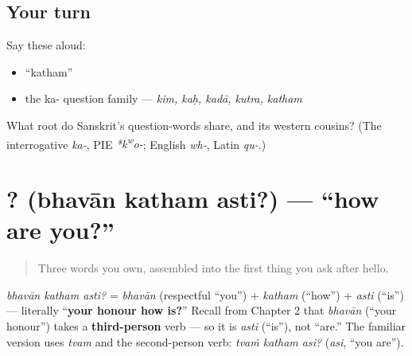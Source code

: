 \subsection*{Your turn}
Say these aloud:

\begin{itemize}
\raggedright
  \item \textquotedblleft{}katham\textquotedblright{}
  \item the ka- question family — \emph{kim, kaḥ, kadā, kutra, katham}
\end{itemize}

\begin{tcolorbox}[breakable,colback=teal!4,colframe=teal!35!black,title={Before you move on}]
What root do Sanskrit's question-words share, and its western cousins? (The interrogative \emph{ka-}, PIE \emph{*k\textsuperscript{w}o-}; English \emph{wh-}, Latin \emph{qu-}.)
\end{tcolorbox}
\section[\texorpdfstring{\sk{भवान्} \sk{कथम्} \sk{अस्ति}? (bhavān katham asti?)}{भवान् कथम् अस्ति? (bhavān katham asti?)}]{  ? (bhavān katham asti?) — \textquotedblleft{}how are you?\textquotedblright{}}

\label{lesson:SA-C03-bhavan-katham-asti}



\begin{quote}
Three words you own, assembled into the first thing you ask after hello.
\end{quote}

\begin{cousinweb}
\emph{bhavān katham asti?} = \emph{bhavān} (respectful \textquotedblleft{}you\textquotedblright{}) + \emph{katham} (\textquotedblleft{}how\textquotedblright{}) + \emph{asti} (\textquotedblleft{}is\textquotedblright{}) — literally \textquotedblleft{}\textbf{your honour how is?}\textquotedblright{} Recall from Chapter 2 that \emph{bhavān} (\textquotedblleft{}your honour\textquotedblright{}) takes a \textbf{third-person} verb — so it is \emph{asti} (\textquotedblleft{}is\textquotedblright{}), not \textquotedblleft{}are.\textquotedblright{} The familiar version uses \emph{tvam} and the second-person verb: \emph{tvaṁ katham asi?} (\emph{asi}, \textquotedblleft{}you are\textquotedblright{}).
\end{cousinweb}

